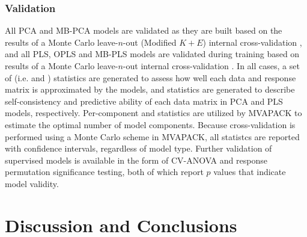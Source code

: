 \subsubsection{Validation}

\begin{doublespace}
All PCA and MB-PCA models are validated as they are built based on the results
of a Monte Carlo leave-$n$-out (Modified $K+E$) internal cross-validation
\cite{eastment:tech1982,eshghi:cils2014}, and all PLS, OPLS and MB-PLS models
are validated during training based on results of a Monte Carlo leave-$n$-out
internal cross-validation \cite{xu:cils2001,xu:jchemo2004}. In all cases, a
set of \rsq{} (i.e. \rsqx{} and \rsqy{}) statistics are generated to assess
how well each data and response matrix is approximated by the models, and
\qsq{} statistics are generated to describe self-consistency and predictive
ability of each data matrix in PCA and PLS models, respectively. Per-component
\rsq{} and \qsq{} statistics are utilized by MVAPACK to estimate the optimal
number of model components. Because cross-validation is performed using a
Monte Carlo scheme in MVAPACK, all \qsq{} statistcs are reported with
confidence intervals, regardless of model type. Further validation of
supervised models is available in the form of CV-ANOVA
\cite{eriksson:jchemo2008} and response permutation
\cite{westerhuis:metab2008a} significance testing, both of which report
$p$ values that indicate model validity.
\end{doublespace}

\section{Discussion and Conclusions}

